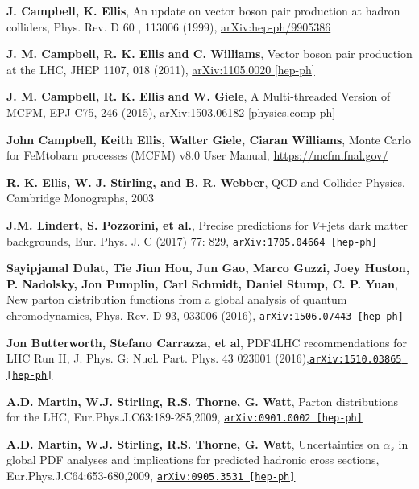 \documentclass[11pt,a4paper,openright,twoside]{report}
\begin{document}
\begin{thebibliography}{9}
\textbf{J. Campbell, K. Ellis},	An update on vector boson pair production at hadron colliders, Phys. Rev. D
60
, 113006 (1999), \href{https://arxiv.org/abs/hep-ph/9905386}{arXiv:hep-ph/9905386}

\textbf{J. M. Campbell, R. K. Ellis and C. Williams}, Vector boson pair production at the LHC, JHEP 1107, 018 (2011), \href{https://arxiv.org/abs/1105.0020}{arXiv:1105.0020 [hep-ph]}

\textbf{J. M. Campbell, R. K. Ellis and W. Giele}, A Multi-threaded Version of MCFM, EPJ C75, 246 (2015), \href{https://arxiv.org/abs/1503.06182}{arXiv:1503.06182 [physics.comp-ph]}

\textbf{John Campbell, Keith Ellis, Walter Giele, Ciaran Williams},	Monte Carlo for FeMtobarn processes (MCFM) v8.0 User Manual, \url{https://mcfm.fnal.gov/}

	\textbf{R. K. Ellis, W. J. Stirling, and B. R. Webber}, QCD and Collider Physics, Cambridge Monographs, 2003

	\textbf{J.M. Lindert, S. Pozzorini, et al.}, Precise predictions for $V$+jets dark matter backgrounds, Eur. Phys. J. C (2017) 77: 829, \href{https://arxiv.org/abs/1705.04664}{\texttt{arXiv:1705.04664 [hep-ph]}}
	
	\textbf{Sayipjamal Dulat, Tie Jiun Hou, Jun Gao, Marco Guzzi, Joey Huston, P. Nadolsky, Jon Pumplin, Carl Schmidt, Daniel Stump, C. P. Yuan}, New parton distribution functions from a global analysis of quantum chromodynamics, Phys. Rev. D 93, 033006 (2016), \href{https://arxiv.org/abs/1506.07443}{\texttt{arXiv:1506.07443 [hep-ph]}}

	\textbf{Jon Butterworth, Stefano Carrazza, et al}, PDF4LHC recommendations for LHC Run II, J. Phys. G: Nucl. Part. Phys. 43 023001 (2016),\href{https://arxiv.org/abs/1510.03865}{\texttt{arXiv:1510.03865 [hep-ph]}}

	\textbf{A.D. Martin, W.J. Stirling, R.S. Thorne, G. Watt}, Parton distributions for the LHC, Eur.Phys.J.C63:189-285,2009, \href{https://arxiv.org/abs/0901.0002}{\texttt{arXiv:0901.0002 [hep-ph]}}
	
	\textbf{A.D. Martin, W.J. Stirling, R.S. Thorne, G. Watt}, Uncertainties on $\alpha_s$ in global PDF analyses and implications for predicted hadronic cross sections, Eur.Phys.J.C64:653-680,2009, \href{https://arxiv.org/abs/0905.3531}{\texttt{arXiv:0905.3531 [hep-ph]}}
	

\end{thebibliography}
\end{document}
